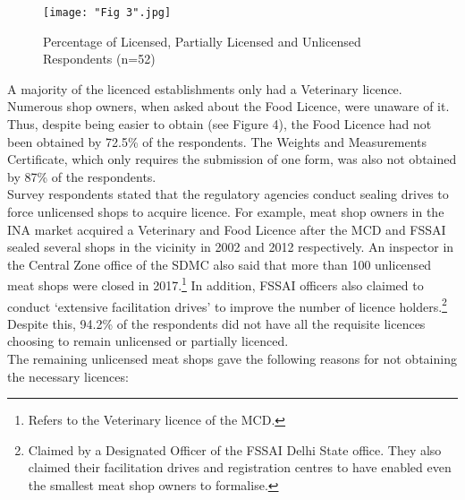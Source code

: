 \documentclass[a4paper, 12pt]{article}
\begin{document}
\begin{figure}[H]
\centering
\texttt{[image: "Fig 3".jpg]}
\caption{Percentage of Licensed, Partially Licensed and Unlicensed Respondents (n=52)}
\end{figure} 



A majority of the licenced establishments only had a Veterinary licence. Numerous shop owners, when asked about the Food Licence, were unaware of it. Thus, despite being easier to obtain (see Figure 4), the Food Licence had not been obtained by 72.5\% of the respondents. The Weights and Measurements Certificate, which only requires the submission of one form, was also not obtained by 87\% of the respondents. \\

Survey respondents stated that the regulatory agencies conduct sealing drives to force unlicensed shops to acquire licence. For example, meat shop owners in the INA market acquired a Veterinary and Food Licence after the MCD and FSSAI sealed several shops in the vicinity in 2002 and 2012 respectively. An inspector in the Central Zone office of the SDMC also said that more than 100 unlicensed meat shops were closed in 2017.\footnote{ Refers to the Veterinary licence of the MCD.} In addition, FSSAI officers also claimed to conduct ‘extensive facilitation drives’ to improve the number of licence holders.\footnote{Claimed by a Designated Officer of the FSSAI Delhi State office. They also claimed their facilitation drives and registration centres to have enabled even the smallest meat shop owners to formalise.}
Despite this, 94.2\% of the respondents did not have all the requisite licences choosing to remain unlicensed or partially licenced.\\

The remaining unlicensed meat shops gave the following reasons for not obtaining the necessary licences:
\end{document}
